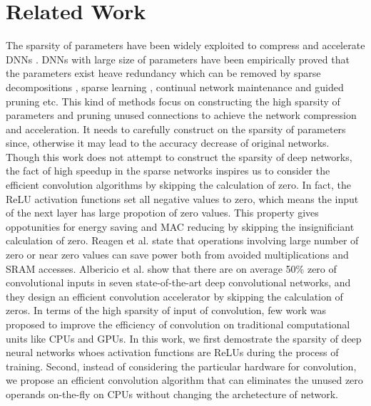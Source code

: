 \documentclass{article}
\begin{document}
\section{Related Work}
\label{s:relatedwork}
The sparsity of parameters have been widely exploited to compress and accelerate DNNs \cite{han2015learning,changpinyo2017power,han2015deep,liu2015sparse,guo2016dynamic,wen2016learning}. DNNs with large size of parameters have been empirically proved that the parameters exist heave redundancy which can be removed by sparse decompositions \cite{liu2015sparse}, sparse learning \cite{wen2016learning}, continual network maintenance \cite{guo2016dynamic} and guided pruning \cite{park2017sparse} etc. This kind of methods focus on constructing the high sparsity of parameters and pruning unused connections to achieve the network compression and acceleration. It needs to carefully construct on the sparsity of parameters since, otherwise it may lead to the accuracy decrease of original networks. Though this work does not attempt to construct the sparsity of deep networks, the fact of high speedup in the sparse networks inspires us to consider the efficient convolution algorithms by skipping the calculation of zero. In fact, the ReLU activation functions set all negative values to zero, which means the input of the next layer has large propotion of zero values. This property gives oppotunities for energy saving \cite{chen2016eyeriss,reagen2016minerva} and MAC reducing \cite{albericio2016cnvlutin} by skipping the insignificiant calculation of zero. Reagen et al. \cite{reagen2016minerva} state that operations involving large number of zero or near zero values can save power both from avoided multiplications and SRAM accesses. Albericio et al. \cite{albericio2016cnvlutin} show that there are on average 50\% zero of convolutional inputs in seven state-of-the-art deep convolutional networks, and they design an efficient convolution accelerator by skipping the calculation of zeros. In terms of the high sparsity of input of convolution, few work was proposed to improve the efficiency of convolution on traditional computational units like CPUs and GPUs. In this work, we first demostrate the sparsity of deep neural networks whoes activation functions are ReLUs during the process of training. Second, instead of considering the particular hardware for convolution, we propose an efficient convolution algorithm that can eliminates the unused zero operands on-the-fly on CPUs without changing the archetecture of network.
\end{document}
